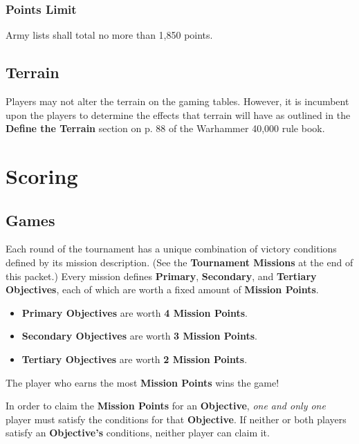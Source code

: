 \documentclass[12pt,titlepage]{article}
\begin{document}
\subsubsection*{Points Limit}

Army lists shall total no more than 1,850 points.

\subsection*{Terrain}

Players may not alter the terrain on the gaming tables. However, it is incumbent upon the players to determine the effects that terrain will have as outlined in the \textbf{Define the Terrain} section on p. 88 of the Warhammer 40,000 rule book.

\newpage

\section*{Scoring}

\subsection*{Games}

Each round of the tournament has a unique combination of victory conditions defined by its mission description. (See the \textbf{Tournament Missions} at the end of this packet.) Every mission defines \textbf{Primary}, \textbf{Secondary}, and \textbf{Tertiary Objectives}, each of which are worth a fixed amount of \textbf{Mission Points}.

\begin{itemize}
\item \textbf{Primary Objectives} are worth \textbf{4 Mission Points}.
\item \textbf{Secondary Objectives} are worth \textbf{3 Mission Points}.
\item \textbf{Tertiary Objectives} are worth \textbf{2 Mission Points}.
\end{itemize}

\noindent The player who earns the most \textbf{Mission Points} wins the game!

In order to claim the \textbf{Mission Points} for an \textbf{Objective}, \textit{one and only one} player must satisfy the conditions for that \textbf{Objective}. If neither or both players satisfy an \textbf{Objective's} conditions, neither player can claim it.
\end{document}
